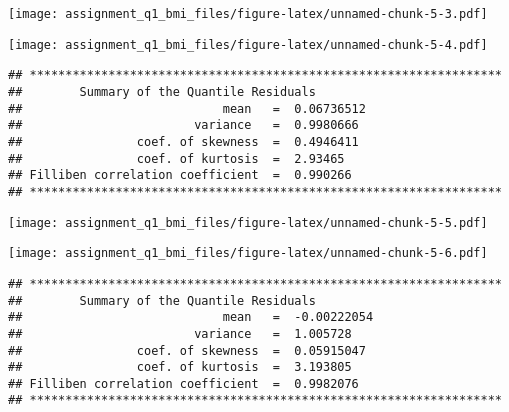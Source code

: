 \texttt{[image: assignment\_q1\_bmi\_files/figure-latex/unnamed-chunk-5-3.pdf]}

\begin{Shaded}
\begin{Highlighting}[]
\end{Highlighting}
\end{Shaded}

\texttt{[image: assignment\_q1\_bmi\_files/figure-latex/unnamed-chunk-5-4.pdf]}

\begin{verbatim}
## ******************************************************************
##        Summary of the Quantile Residuals
##                            mean   =  0.06736512 
##                        variance   =  0.9980666 
##                coef. of skewness  =  0.4946411 
##                coef. of kurtosis  =  2.93465 
## Filliben correlation coefficient  =  0.990266 
## ******************************************************************
\end{verbatim}

\begin{Shaded}
\begin{Highlighting}[]
\OtherTok{\textless{}{-}} \NormalTok{, }\NormalTok{, }\NormalTok{(}\NormalTok{,}\NormalTok{), }\NormalTok{(}\NormalTok{,}\NormalTok{), }
\end{Highlighting}
\end{Shaded}

\texttt{[image: assignment\_q1\_bmi\_files/figure-latex/unnamed-chunk-5-5.pdf]}

\begin{Shaded}
\begin{Highlighting}[]
\end{Highlighting}
\end{Shaded}

\texttt{[image: assignment\_q1\_bmi\_files/figure-latex/unnamed-chunk-5-6.pdf]}

\begin{verbatim}
## ******************************************************************
##        Summary of the Quantile Residuals
##                            mean   =  -0.00222054 
##                        variance   =  1.005728 
##                coef. of skewness  =  0.05915047 
##                coef. of kurtosis  =  3.193805 
## Filliben correlation coefficient  =  0.9982076 
## ******************************************************************
\end{verbatim}

